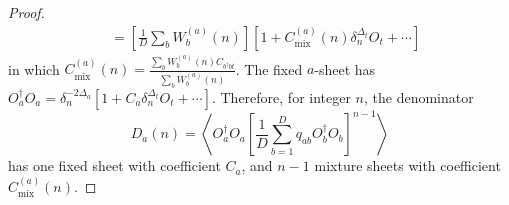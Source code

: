 \documentclass{article}
\theoremstyle{plain}
\theoremstyle{definition}
\theoremstyle{plain}
\begin{document}
\begin{proof}
\begin{equation}
\begin{aligned}
&= \left[\frac{1}{D} \sum_b W_b^{(a)}(n)\right]\left[1+C_{\text {mix }}^{(a)}(n) \delta_n^{\Delta_t} O_t+\cdots\right]
\end{aligned}
\end{equation}
in which $C_{\mathrm{mix}}^{(a)}(n)=\frac{\sum_b W_b^{(a)}(n) C_{b^{\dagger} b t}}{\sum_b W_b^{(a)}(n)}$. The fixed $a$-sheet has $O_a^{\dagger} O_a=\delta_n^{-2 \Delta_a}\left[1+C_a \delta_n^{\Delta_t} O_t+\cdots\right]$. Therefore, for integer $n$, the denominator
\begin{equation}
    D_a(n)=\left\langle O_a^{\dagger} O_a\left[\frac{1}{D} \sum_{b=1}^D q_{a b} O_b^{\dagger} O_b\right]^{n-1}\right\rangle
\end{equation}
has one fixed sheet with coefficient $C_a$, and $n-1$ mixture sheets with coefficient $C_{\text {mix }}^{(a)}(n)$.


\end{proof}
\end{document}
